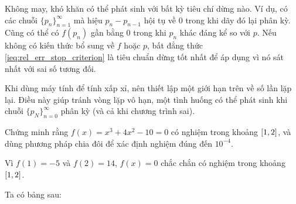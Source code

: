 \documentclass[../../Lectures]{subfiles}
\begin{document}
Không may, khó khăn có thể phát sinh với bất kỳ tiêu chí dừng nào. Ví dụ, có các
chuỗi \(\{p_n\}_{n=1}^\infty\) mà hiệu \(p_n - p_{n - 1}\) hội tụ về \num{0}
trong khi dãy đó lại phân kỳ. Cũng có thể có \(f(p_n)\) gần bằng \num{0} trong
khi \(p_n\) khác đáng kể so với \(p\). Nếu không có kiến thức bổ sung về \(f\)
hoặc \(p\), bất đẳng thức \ref{ieq:rel_err_stop_criterion} là tiêu chuẩn dừng tốt
nhất để áp dụng vì nó sát nhất với sai số tương đối.

Khi dùng máy tính để tính xấp xỉ, nên thiết lập một giới hạn trên về số lần lặp
lại. Điều này giúp tránh vòng lặp vô hạn, một tình huống có thể phát sinh khi
chuỗi \(\{p_N\}_{n=0}^\infty\) phân kỳ (và cả khi chương trình sai).

\begin{exmp}
    Chứng minh rằng \(f(x) = x^3 + 4x^2 - 10 = 0\) có nghiệm trong khoảng
    \(\interval{1}{2}\), và dùng phương pháp chia đôi để xác định nghiệm đúng
    đến \(10^{-4}\).

    Vì \(f(1) = -5\) và \(f(2) = 14\), \(f(x) = 0\) chắc chắn có nghiệm trong
    khoảng \(\interval{1}{2}\).

    Ta có bảng sau:


\end{exmp}
\end{document}
